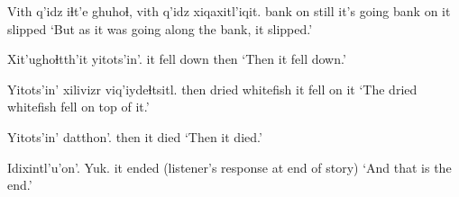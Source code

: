 \documentclass[12pt]{article}
\begin{document}
\gll Vith q'idz iɬt'e ghuhoɬ, vith q'idz xiqaxitl'iqit.
bank on still {it's going} bank on {it slipped}
\glt `But as it was going along the bank, it slipped.'
\glend

\gll Xit'ughoɬtth'it yitots'in'.
{it fell down} then
\glt `Then it fell down.'
\glend

\gll Yitots'in' xilivizr viq'iydeɬtsitl.
then {dried whitefish} {it fell on it}
\glt `The dried whitefish fell on top of it.'
\glend

\gll Yitots'in' datthon'.
then {it died}
\glt `Then it died.'
\glend

\gll Idixintl'u'on'. Yuk. 
{it ended} {(listener's response at end of story)}
\glt `And that is the end.'
\glend
\end{document}
